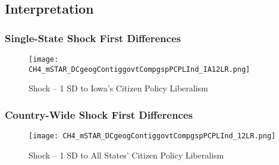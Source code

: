 \documentclass{beamer}
\begin{document}

\subsection{Interpretation}

\begin{frame}
	\frametitle{Single-State Shock First Differences}
	\begin{figure}[p]
		\centering
		\texttt{[image: CH4\_mSTAR\_DCgeogContiggovtCompgspPCPLInd\_IA12LR.png]}
		\caption{Shock -- 1 SD to Iowa's Citizen Policy Liberalism}
		\label{fig:fig_1}
	\end{figure}
\end{frame}

\begin{frame}
	\frametitle{Country-Wide Shock First Differences}
	\begin{figure}[p]
		\centering
		\texttt{[image: CH4\_mSTAR\_DCgeogContiggovtCompgspPCPLInd\_12LR.png]}
		\caption{Shock -- 1 SD to All States' Citizen Policy Liberalism}
		\label{fig:fig_2}
	\end{figure}
\end{frame}
\end{document}

